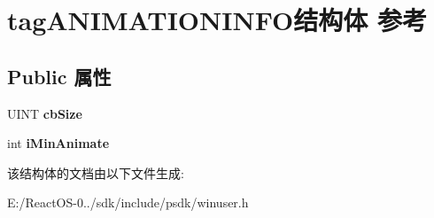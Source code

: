 \hypertarget{structtag_a_n_i_m_a_t_i_o_n_i_n_f_o}{}\section{tag\+A\+N\+I\+M\+A\+T\+I\+O\+N\+I\+N\+F\+O结构体 参考}
\label{structtag_a_n_i_m_a_t_i_o_n_i_n_f_o}
\subsection*{Public 属性}
\begin{DoxyCompactItemize}
\item 
\mbox{\label{structtag_a_n_i_m_a_t_i_o_n_i_n_f_o_a55699d0773a52bb64f8c364aca86cf63}} 
U\+I\+NT {\bfseries cb\+Size}
\item 
\mbox{\label{structtag_a_n_i_m_a_t_i_o_n_i_n_f_o_ab9e08b7fed345922397125229861609e}} 
int {\bfseries i\+Min\+Animate}
\end{DoxyCompactItemize}


该结构体的文档由以下文件生成\+:\begin{DoxyCompactItemize}
\item 
E\+:/\+React\+O\+S-\/0../sdk/include/psdk/winuser.\+h\end{DoxyCompactItemize}
